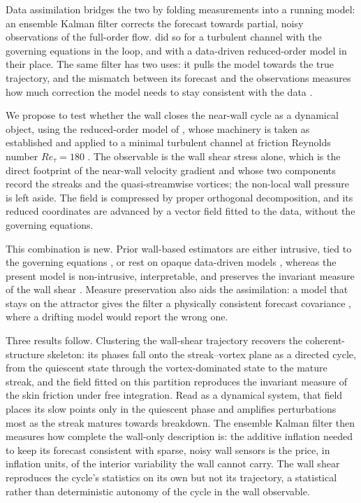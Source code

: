 \documentclass[pdflatex,sn-basic]{sn-jnl}
\theoremstyle{thmstyleone}%
\theoremstyle{thmstyletwo}%
\theoremstyle{thmstylethree}%
\begin{document}
Data assimilation bridges the two by folding measurements into a running model:
an ensemble Kalman
filter corrects the forecast towards partial, noisy observations of the
full-order flow. \citet{colburn2011state} did so for a turbulent channel with
the governing equations in the loop, and \citet{ozalp2026realtime} with a
data-driven reduced-order model in their place. The same filter has two uses:
it pulls the model towards the true trajectory, and the mismatch between its
forecast and the observations measures how much correction the model needs to
stay consistent with the data \citep{desroziers2005diagnosis,anderson2007adaptive}.

We propose to test whether the wall closes the near-wall cycle as a dynamical
object, using the reduced-order model of \citet{perezcuadrado2026manifold}, whose
machinery is taken as established and applied to a minimal turbulent channel
\citep{jimenez1991minimal} at friction Reynolds number $Re_\tau = 180$
\citep{kim1987turbulence}. The observable is the wall shear stress alone, which is
the direct footprint of the near-wall velocity gradient and whose two components
record the streaks and the quasi-streamwise vortices; the non-local wall pressure
is left aside. The field is compressed by proper orthogonal
decomposition, and its reduced coordinates are advanced by a vector field fitted
to the data, without the governing equations.

This combination is new. Prior wall-based estimators are either intrusive, tied
to the governing equations \citep{colburn2011state}, or rest on opaque
data-driven models \citep{ozalp2026realtime}, whereas the present model is
non-intrusive, interpretable, and preserves the invariant measure of the wall
shear \citep{vlachas2020}. Measure preservation also aids the assimilation: a
model that stays on the attractor gives the filter a physically consistent
forecast covariance \citep{evensen2003ensemble,dee1995online}, where a drifting
model would report the wrong one.

Three results follow. Clustering the wall-shear trajectory recovers the
coherent-structure skeleton: its phases fall onto the streak--vortex plane as a
directed cycle, from the quiescent state through the vortex-dominated state to the
mature streak, and the field fitted on this partition reproduces the invariant
measure of the skin friction under free integration. Read as a dynamical system,
that field places its slow points only in the quiescent phase and amplifies perturbations
most as the streak matures towards breakdown. The ensemble Kalman filter
then measures how complete the wall-only description is: the additive inflation
needed to keep its forecast consistent with sparse, noisy wall sensors is the
price, in inflation units, of the interior variability the wall cannot carry. The
wall shear reproduces the cycle's statistics on its own but not its trajectory, a
statistical rather than deterministic autonomy of the cycle in the wall
observable.
\end{document}
